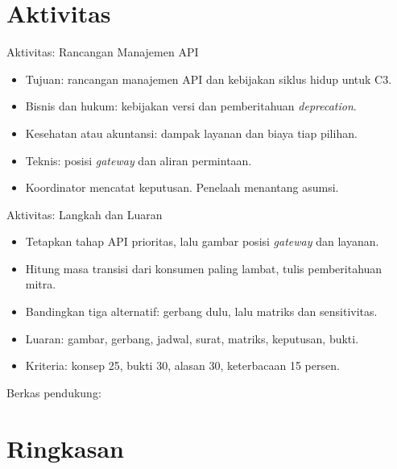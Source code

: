 \documentclass[aspectratio=169, table, 12pt]{beamer}
\begin{document}
\section{Aktivitas}

\begin{frame}{{\Large Aktivitas: Rancangan Manajemen API}}
  \vspace{8pt}
  \begin{itemize}
    \item Tujuan: rancangan manajemen API dan kebijakan siklus hidup untuk C3.
    \item Bisnis dan hukum: kebijakan versi dan pemberitahuan \textit{deprecation}.
    \item Kesehatan atau akuntansi: dampak layanan dan biaya tiap pilihan.
    \item Teknis: posisi \textit{gateway} dan aliran permintaan.
    \item Koordinator mencatat keputusan. Penelaah menantang asumsi.
  \end{itemize}
\end{frame}

\begin{frame}{{\Large Aktivitas: Langkah dan Luaran}}
  \vspace{6pt}
  \begin{itemize}
    \item Tetapkan tahap API prioritas, lalu gambar posisi \textit{gateway} dan layanan.
    \item Hitung masa transisi dari konsumen paling lambat, tulis pemberitahuan mitra.
    \item Bandingkan tiga alternatif: gerbang dulu, lalu matriks dan sensitivitas.
    \item Luaran: gambar, gerbang, jadwal, surat, matriks, keputusan, bukti.
    \item Kriteria: konsep 25, bukti 30, alasan 30, keterbacaan 15 persen.
  \end{itemize}
  \vspace{4pt}
  {\small Berkas pendukung: }
\end{frame}

\section{Ringkasan}
\end{document}
